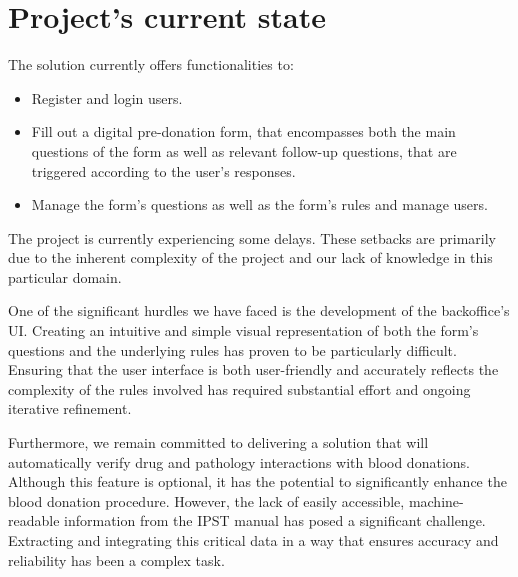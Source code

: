 \chapter{Project's current state} \label{cap:state}

The solution currently offers functionalities to:
\begin{itemize}
	\item Register and login users.
	
	\item Fill out a digital pre-donation form, that encompasses both the main questions of the form as well as relevant follow-up questions, that are triggered according to the user's responses.
	
	\item Manage the form's questions as well as the form's rules and manage users.
\end{itemize}

The project is currently experiencing some delays. These setbacks are primarily due to the inherent complexity of the project and our lack of knowledge in this particular domain.

One of the significant hurdles we have faced is the development of the backoffice's UI. Creating an intuitive and simple visual representation of both the form's questions and the underlying rules has proven to be particularly difficult. Ensuring that the user interface is both user-friendly and accurately reflects the complexity of the rules involved has required substantial effort and ongoing iterative refinement.

Furthermore, we remain committed to delivering a solution that will automatically verify drug and pathology interactions with blood donations. Although this feature is optional, it has the potential to significantly enhance the blood donation procedure. However, the lack of easily accessible, machine-readable information from the IPST manual has posed a significant challenge. Extracting and integrating this critical data in a way that ensures accuracy and reliability has been a complex task.
